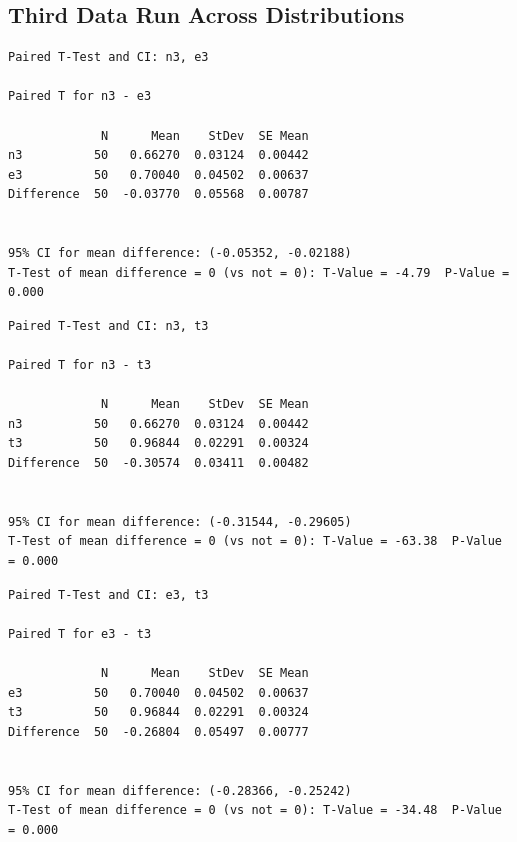 \documentclass[letterpaper,10pt]{article}
\begin{document}
\subsection{Third Data Run Across Distributions}
\begin{samepage}
\begin{verbatim}
Paired T-Test and CI: n3, e3 

Paired T for n3 - e3

             N      Mean    StDev  SE Mean
n3          50   0.66270  0.03124  0.00442
e3          50   0.70040  0.04502  0.00637
Difference  50  -0.03770  0.05568  0.00787


95% CI for mean difference: (-0.05352, -0.02188)
T-Test of mean difference = 0 (vs not = 0): T-Value = -4.79  P-Value = 0.000
\end{verbatim}
\end{samepage}
\begin{samepage}
\begin{verbatim}
Paired T-Test and CI: n3, t3 

Paired T for n3 - t3

             N      Mean    StDev  SE Mean
n3          50   0.66270  0.03124  0.00442
t3          50   0.96844  0.02291  0.00324
Difference  50  -0.30574  0.03411  0.00482


95% CI for mean difference: (-0.31544, -0.29605)
T-Test of mean difference = 0 (vs not = 0): T-Value = -63.38  P-Value = 0.000
\end{verbatim}
\end{samepage}
\begin{samepage}
\begin{verbatim}
Paired T-Test and CI: e3, t3 

Paired T for e3 - t3

             N      Mean    StDev  SE Mean
e3          50   0.70040  0.04502  0.00637
t3          50   0.96844  0.02291  0.00324
Difference  50  -0.26804  0.05497  0.00777


95% CI for mean difference: (-0.28366, -0.25242)
T-Test of mean difference = 0 (vs not = 0): T-Value = -34.48  P-Value = 0.000
\end{verbatim}
\end{samepage}
\end{document}

